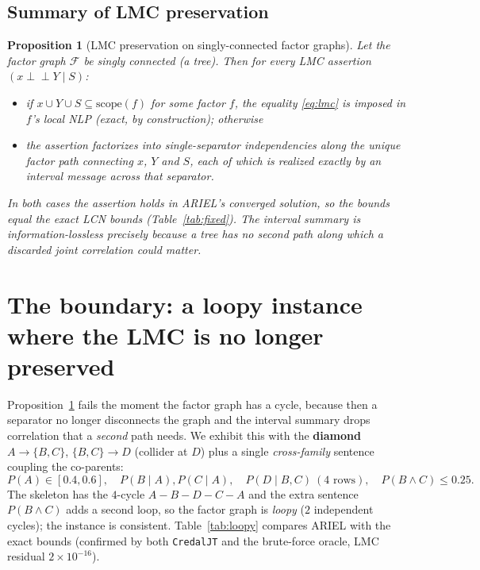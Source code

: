 \documentclass[11pt]{article}
\newtheorem{proposition}{Proposition}
\newcommand{\indep}{\perp\!\!\!\perp}
\begin{document}
\subsection{Summary of LMC preservation}
\begin{proposition}[LMC preservation on singly-connected factor graphs]\label{prop:lmc}
Let the factor graph $\mathcal F$ be singly connected (a tree). Then for every LMC assertion
$(x\indep Y\mid S)$:
\begin{itemize}
  \item if $x\cup Y\cup S\subseteq\mathrm{scope}(f)$ for some factor $f$, the equality
    \eqref{eq:lmc} is imposed in $f$'s local NLP (exact, by construction); otherwise
  \item the assertion factorizes into single-separator independencies along the unique factor path
    connecting $x$, $Y$ and $S$, each of which is realized exactly by an interval message across
    that separator.
\end{itemize}
In both cases the assertion holds in ARIEL's converged solution, so the bounds equal the exact LCN
bounds (Table~\ref{tab:fixed}). The interval summary is information-lossless precisely because a
tree has no second path along which a discarded joint correlation could matter.
\end{proposition}

\section{The boundary: a loopy instance where the LMC is no longer preserved}\label{sec:loopy}

Proposition~\ref{prop:lmc} fails the moment the factor graph has a cycle, because then a separator
no longer disconnects the graph and the interval summary drops correlation that a \emph{second}
path needs. We exhibit this with the \textbf{diamond} $A\!\to\!\{B,C\}$, $\{B,C\}\!\to\!D$ (collider
at $D$) plus a single \emph{cross-family} sentence coupling the co-parents:
\[
  P(A)\!\in\![0.4,0.6],\quad P(B\mid A),P(C\mid A),\quad P(D\mid B,C)\ (\text{4 rows}),\quad
  \boxed{P(B\land C)\le 0.25}.
\]
The skeleton has the $4$-cycle $A\!-\!B\!-\!D\!-\!C\!-\!A$ and the extra sentence
$P(B\land C)$ adds a second loop, so the factor graph is \emph{loopy} ($2$ independent cycles); the
instance is consistent. Table~\ref{tab:loopy} compares ARIEL with the exact bounds (confirmed by
both \texttt{CredalJT} and the brute-force oracle, LMC residual $2\times10^{-16}$).
\end{document}
